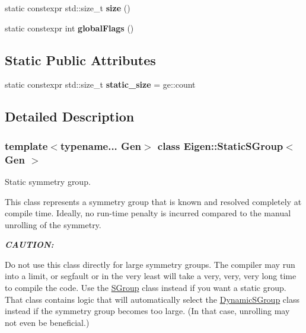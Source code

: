 \begin{DoxyCompactItemize}
\item 
\mbox{\label{class_eigen_1_1_static_s_group_a5b66f953f928ef6991071e7e9a2b1d17}} 
static constexpr std\+::size\+\_\+t {\bfseries size} ()
\item 
\mbox{\label{class_eigen_1_1_static_s_group_a3f2a5db32ba88188eb9fdcedcde616ac}} 
static constexpr int {\bfseries global\+Flags} ()
\end{DoxyCompactItemize}
\subsection*{Static Public Attributes}
\begin{DoxyCompactItemize}
\item 
\mbox{\label{class_eigen_1_1_static_s_group_aed30d61f954aa35a9e3153d614c05e55}} 
static constexpr std\+::size\+\_\+t {\bfseries static\+\_\+size} = ge\+::count
\end{DoxyCompactItemize}


\subsection{Detailed Description}
\subsubsection*{template$<$typename... Gen$>$\newline
class Eigen\+::\+Static\+S\+Group$<$ Gen $>$}

Static symmetry group. 

This class represents a symmetry group that is known and resolved completely at compile time. Ideally, no run-\/time penalty is incurred compared to the manual unrolling of the symmetry.

{\bfseries {\itshape C\+A\+U\+T\+I\+ON\+:}}

Do not use this class directly for large symmetry groups. The compiler may run into a limit, or segfault or in the very least will take a very, very, very long time to compile the code. Use the \hyperlink{class_eigen_1_1_s_group}{S\+Group} class instead if you want a static group. That class contains logic that will automatically select the \hyperlink{class_eigen_1_1_dynamic_s_group}{Dynamic\+S\+Group} class instead if the symmetry group becomes too large. (In that case, unrolling may not even be beneficial.) 


